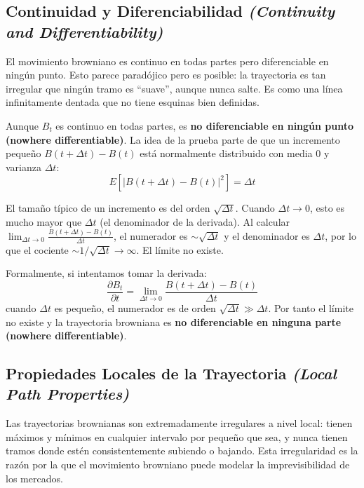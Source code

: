 \documentclass[12pt]{article}
\begin{document}
\subsection{Continuidad y Diferenciabilidad \textit{(Continuity and Differentiability)}}

\begin{intuicion}
El movimiento browniano es continuo en todas partes pero diferenciable en ning\'un punto. Esto parece paradójico pero es posible: la trayectoria es tan irregular que ning\'un tramo es ``suave'', aunque nunca salte. Es como una l\'inea infinitamente dentada que no tiene esquinas bien definidas.
\end{intuicion}

Aunque $B_t$ es continuo en todas partes, es \textbf{no diferenciable en ning\'un punto (nowhere differentiable)}. La idea de la prueba parte de que un incremento peque\~no $B(t+\Delta t) - B(t)$ est\'a normalmente distribuido con media 0 y varianza $\Delta t$:
\begin{equation}
  E\!\left[|B(t+\Delta t) - B(t)|^2\right] = \Delta t
\end{equation}

\begin{intuicionmat}
El tama\~no t\'ipico de un incremento es del orden $\sqrt{\Delta t}$. Cuando $\Delta t \to 0$, esto es mucho mayor que $\Delta t$ (el denominador de la derivada). Al calcular $\lim_{\Delta t \to 0} \frac{B(t+\Delta t)-B(t)}{\Delta t}$, el numerador es $\sim\sqrt{\Delta t}$ y el denominador es $\Delta t$, por lo que el cociente $\sim 1/\sqrt{\Delta t} \to \infty$. El l\'imite no existe.
\end{intuicionmat}

Formalmente, si intentamos tomar la derivada:
\[
  \frac{\partial B_t}{\partial t} = \lim_{\Delta t \to 0} \frac{B(t+\Delta t) - B(t)}{\Delta t}
\]
cuando $\Delta t$ es peque\~no, el numerador es de orden $\sqrt{\Delta t} \gg \Delta t$. Por tanto el l\'imite no existe y la trayectoria browniana es \textbf{no diferenciable en ninguna parte (nowhere differentiable)}.

\subsection{Propiedades Locales de la Trayectoria \textit{(Local Path Properties)}}

\begin{intuicion}
Las trayectorias brownianas son extremadamente irregulares a nivel local: tienen m\'aximos y m\'inimos en cualquier intervalo por peque\~no que sea, y nunca tienen tramos donde est\'en consistentemente subiendo o bajando. Esta irregularidad es la raz\'on por la que el movimiento browniano puede modelar la imprevisibilidad de los mercados.
\end{intuicion}
\end{document}
